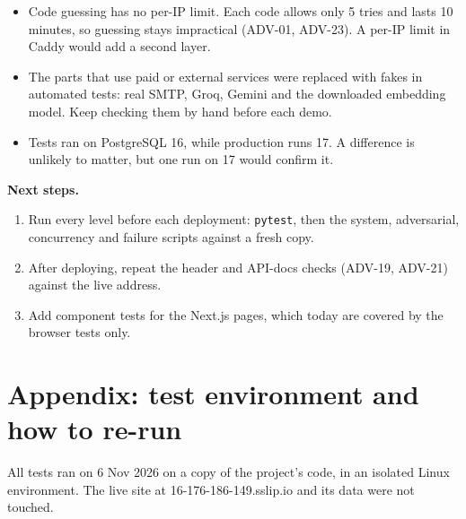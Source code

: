 \begin{itemize}
\item Code guessing has no per-IP limit. Each code allows only 5 tries and lasts 10 minutes, so guessing stays impractical (ADV-01, ADV-23). A per-IP limit in Caddy would add a second layer.
\item The parts that use paid or external services were replaced with fakes in automated tests: real SMTP, Groq, Gemini and the downloaded embedding model. Keep checking them by hand before each demo.
\item Tests ran on PostgreSQL 16, while production runs 17. A difference is unlikely to matter, but one run on 17 would confirm it.
\end{itemize}

\textbf{Next steps.}

\begin{enumerate}
\item Run every level before each deployment: \texttt{pytest}, then the system, adversarial, concurrency and failure scripts against a fresh copy.
\item After deploying, repeat the header and API-docs checks (ADV-19, ADV-21) against the live address.
\item Add component tests for the Next.js pages, which today are covered by the browser tests only.
\end{enumerate}

\section*{Appendix: test environment and how to re-run}

All tests ran on 6 Nov 2026 on a copy of the project’s code, in an isolated Linux environment. The live site at 16-176-186-149.sslip.io and its data were not touched.

